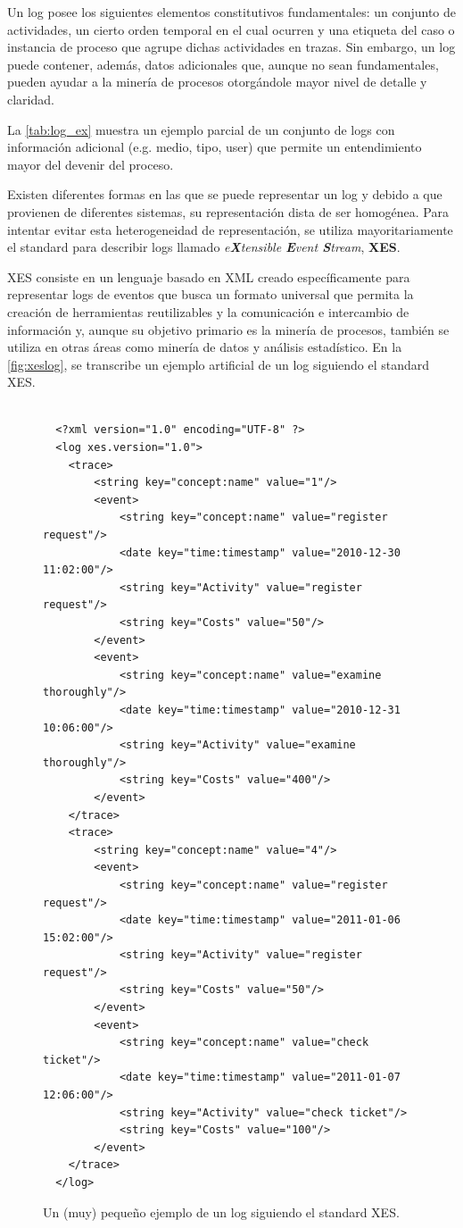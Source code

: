 Un log posee los siguientes elementos constitutivos fundamentales: un conjunto de actividades,
un cierto orden temporal en el cual ocurren y una etiqueta del  caso o instancia de proceso
que agrupe dichas actividades en trazas.
Sin embargo, un log puede contener, además, datos adicionales que, aunque no sean fundamentales, pueden
ayudar a la minería de procesos otorgándole mayor nivel de detalle y claridad.

La \autoref{tab:log_ex} muestra un ejemplo parcial de un conjunto de logs con información 
adicional (e.g. medio, tipo, user) que permite un entendimiento mayor del devenir del proceso.



Existen diferentes formas en las que se puede representar un log y debido a que provienen de diferentes
sistemas, su representación dista de ser homogénea. Para intentar evitar esta heterogeneidad de representación,
se utiliza mayoritariamente el standard para describir logs llamado 
\textit{e\textbf{X}tensible \textbf{E}vent \textbf{S}tream}, \textbf{XES}.

XES consiste en un lenguaje basado en XML creado específicamente para representar logs de eventos que busca 
un formato universal que permita la creación de herramientas reutilizables y la comunicación e intercambio de 
información y, aunque su objetivo primario es la minería de procesos, también se 
utiliza en otras áreas como minería de datos y análisis estadístico.
En la \autoref{fig:xeslog}, se transcribe un ejemplo artificial de un log siguiendo el standard XES.

\begin{figure}[t]
    \begin{verbatim}
    
  <?xml version="1.0" encoding="UTF-8" ?>
  <log xes.version="1.0">
  	<trace>
  		<string key="concept:name" value="1"/>
  		<event>
  			<string key="concept:name" value="register request"/>
  			<date key="time:timestamp" value="2010-12-30 11:02:00"/>
  			<string key="Activity" value="register request"/>
  			<string key="Costs" value="50"/>
  		</event>
  		<event>
  			<string key="concept:name" value="examine thoroughly"/>
  			<date key="time:timestamp" value="2010-12-31 10:06:00"/>
  			<string key="Activity" value="examine thoroughly"/>
  			<string key="Costs" value="400"/>
  		</event>
  	</trace>
  	<trace>
  		<string key="concept:name" value="4"/>
  		<event>
  			<string key="concept:name" value="register request"/>
  			<date key="time:timestamp" value="2011-01-06 15:02:00"/>
  			<string key="Activity" value="register request"/>
  			<string key="Costs" value="50"/>
  		</event>
  		<event>
  			<string key="concept:name" value="check ticket"/>
  			<date key="time:timestamp" value="2011-01-07 12:06:00"/>
  			<string key="Activity" value="check ticket"/>
  			<string key="Costs" value="100"/>
  		</event>
  	</trace>
  </log>
    \end{verbatim}
    \caption{Un (muy) pequeño ejemplo de un log siguiendo el standard XES.}
    \label{fig:xeslog}
\end{figure}

